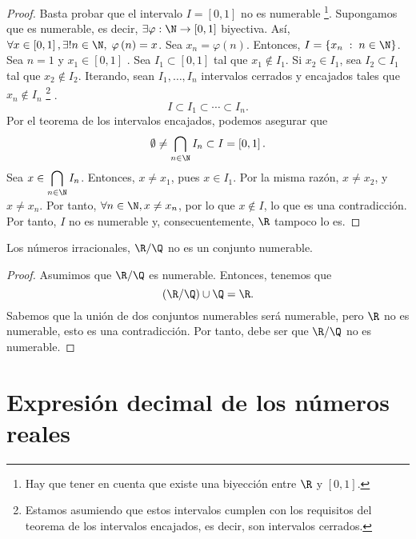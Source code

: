 \begin{proof}
	Basta probar que el intervalo $\displaystyle I =\left[0,1\right]  $ no es numerable \footnote{Hay que tener en cuenta que existe una biyección entre $\displaystyle \R $ y $\displaystyle \left[0,1\right]  $.}. Supongamos que es numerable, es decir, $\displaystyle \exists \varphi : \N \to \left[0,1\right]  $ biyectiva. Así, $\displaystyle \forall x \in \left[0,1\right], \exists! n \in \N, \; \varphi\left(n\right) =x $. Sea $\displaystyle x_{n}=\varphi\left(n\right) $. Entonces, $\displaystyle I = \left\{ x_{n} \; : \; n \in \N\right\}  $. Sea $\displaystyle n = 1 $ y $\displaystyle x_{1} \in [0,1] $ . Sea $\displaystyle I_{1} \subset \left[0,1\right]  $ tal que $\displaystyle x_{1} \not\in I_{1} $. Si $\displaystyle x_{2} \in I_{1} $, sea $\displaystyle I_{2}\subset I_{1} $ tal que $\displaystyle x_{2} \not\in I_{2} $. Iterando, sean $\displaystyle I_{1}, \ldots, I_{n} $ intervalos cerrados y encajados tales que $\displaystyle x_{n} \not\in I_{n} $ \footnote{Estamos asumiendo que estos intervalos cumplen con los requisitos del teorema de los intervalos encajados, es decir, son intervalos cerrados.} .
	\[I \subset I_{1} \subset \cdots \subset I_{n} .\]
Por el teorema de los intervalos encajados, podemos asegurar que 
\[\emptyset\neq\bigcap_{n\in \N} I_{n} \subset I = \left[0,1\right]  .\]
Sea $\displaystyle x \in \bigcap_{n\in \N}I_{n} $. Entonces, $\displaystyle x \neq x_{1}$, pues $x \in I_{1} $. Por la misma razón, $\displaystyle x \neq x_{2} $, y $\displaystyle x \neq x_{n} $. Por tanto, $\displaystyle \forall n \in \N, x \neq x_{n} $, por lo que $\displaystyle x \not\in I $, lo que es una contradicción. Por tanto, $\displaystyle I $ no es numerable y, consecuentemente, $\displaystyle \R $ tampoco lo es.
\end{proof}

\begin{fcolorary}[]
\normalfont Los números irracionales, $\displaystyle \R/\Q $ no es un conjunto numerable.
\end{fcolorary}

\begin{proof}
Asumimos que $\displaystyle \R/\Q $ es numerable. Entonces, tenemos que 
\[\left(\R/\Q\right)\cup\Q = \R .\]
Sabemos que la unión de dos conjuntos numerables será numerable, pero $\displaystyle \R $ no es numerable, esto es una contradicción. Por tanto, debe ser que $\displaystyle \R/\Q $ no es numerable.
\end{proof}

\section{Expresión decimal de los números reales}

